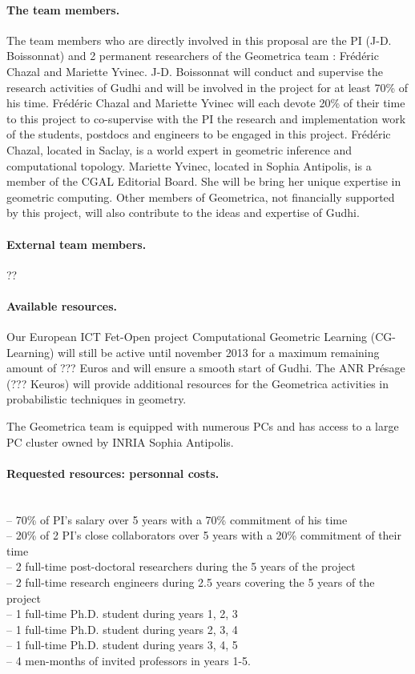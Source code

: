 \paragraph{The team members.}
The team members who are directly involved in this proposal are the PI (J-D. Boissonnat) and 2 permanent researchers of the Geometrica team : Fr\'ed\'eric Chazal and Mariette Yvinec.  J-D. Boissonnat will conduct and supervise the research activities of Gudhi and will be involved in the project for at least 70\% of his time.  Fr\'ed\'eric Chazal and Mariette Yvinec will each devote 20\% of their time to this project to co-supervise with the PI the research and implementation work of the students, postdocs and engineers to be engaged in this project. Fr\'ed\'eric Chazal, located in Saclay,  is a world expert in geometric inference and computational topology. Mariette Yvinec, located in Sophia Antipolis,  is a member of the CGAL Editorial Board. She  will be bring her unique expertise in geometric computing. Other members of Geometrica, not financially supported by this project, will also contribute to the ideas and expertise of Gudhi.

\paragraph{External team members.} ??

\paragraph{Available resources.} Our European ICT Fet-Open project Computational Geometric Learning (CG-Learning) will still be active until november 2013 for a maximum remaining amount of ??? Euros and will ensure a smooth start of Gudhi.  The ANR Pr\'esage (??? Keuros) will provide additional resources for the Geometrica activities in probabilistic techniques in geometry.

The Geometrica team is equipped with numerous PCs and has access to a large PC cluster owned by INRIA Sophia Antipolis.

\paragraph{Requested resources: personnal costs.}\mbox{}\\
-- 70\% of PI's salary over 5 years with a 70\% commitment of his time\\
-- 20\% of 2 PI's close collaborators over 5 years with a 20\% commitment of their time\\
-- 2 full-time post-doctoral researchers during the 5 years of the project\\
-- 2 full-time research engineers during 2.5 years covering the 5 years of the project\\
-- 1 full-time Ph.D. student during years 1, 2, 3\\
-- 1 full-time Ph.D. student during years 2, 3, 4\\
-- 1 full-time Ph.D. student during years 3, 4, 5\\
-- 4 men-months of invited professors in years 1-5.

